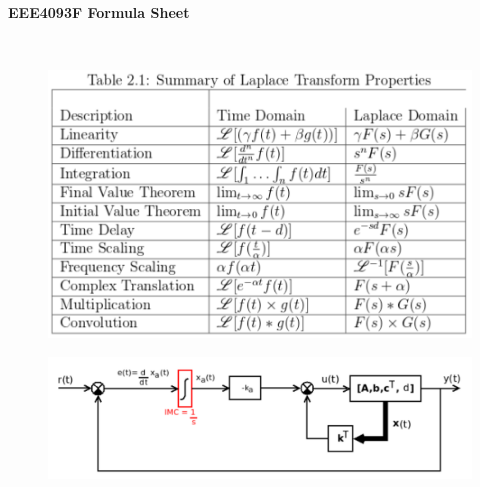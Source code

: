 \documentclass[a4paper, 10pt, titlepage]{article}
\begin{document}
\newpage
\begin{center}
\begin{LARGE}
\textbf{EEE4093F Formula Sheet}
\end{LARGE} \\ \medskip
\end{center}

\begin{paracol}{3}[]

\switchcolumn

\switchcolumn

\end{paracol}

\newpage
\begin{paracol}{2}[]
\medskip \medskip
\begin{figure}
\begin{center}
\includegraphics[scale=0.5]{laplace-properties.pdf}
\end{center}
\end{figure}

\begin{figure}
\begin{center}
\includegraphics[scale=0.3]{setpoint-statef.pdf}
\end{center}
\end{figure}


\end{paracol}
\end{document}
